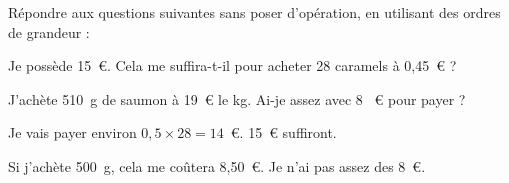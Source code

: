 \par Répondre aux questions suivantes sans poser d'opération, en utilisant des ordres de grandeur :
\begin{myenumerate}
\item Je possède 15~\textgreek{\euro}. Cela me suffira-t-il pour acheter 28 caramels à 0,45~\textgreek{\euro} ?
\item J'achète 510~g de saumon à 19~\textgreek{\euro} le kg. Ai-je assez avec 8 ~\textgreek{\euro} pour payer ?
\end{myenumerate}
\begin{myenumerate}
  \item Je vais payer environ $0,5\times28=14$~\textgreek{\euro}. 15~\textgreek{\euro} suffiront.
  \item Si j'achète 500~g, cela me coûtera 8,50~\textgreek{\euro}. Je n'ai pas assez des 8~\textgreek{\euro}.
\end{myenumerate}